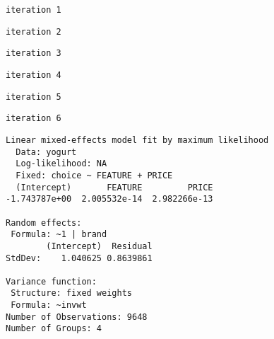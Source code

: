 \documentclass[]{book}
\begin{document}
\begin{verbatim}
iteration 1
\end{verbatim}

\begin{verbatim}
iteration 2
\end{verbatim}

\begin{verbatim}
iteration 3
\end{verbatim}

\begin{verbatim}
iteration 4
\end{verbatim}

\begin{verbatim}
iteration 5
\end{verbatim}

\begin{verbatim}
iteration 6
\end{verbatim}

\begin{verbatim}
Linear mixed-effects model fit by maximum likelihood
  Data: yogurt 
  Log-likelihood: NA
  Fixed: choice ~ FEATURE + PRICE 
  (Intercept)       FEATURE         PRICE 
-1.743787e+00  2.005532e-14  2.982266e-13 

Random effects:
 Formula: ~1 | brand
        (Intercept)  Residual
StdDev:    1.040625 0.8639861

Variance function:
 Structure: fixed weights
 Formula: ~invwt 
Number of Observations: 9648
Number of Groups: 4 
\end{verbatim}


\end{document}
